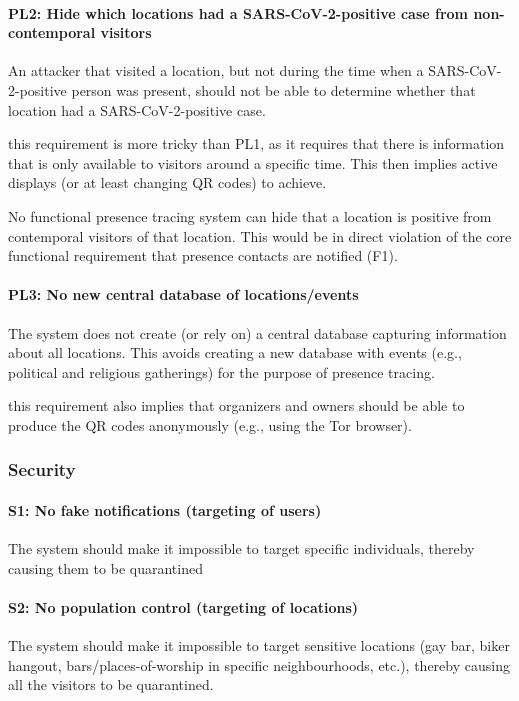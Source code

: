\paragraph{PL2: Hide which locations had a SARS-CoV-2-positive case from non-contemporal visitors} An attacker that visited a location, but not during the time when a SARS-CoV-2-positive person was present, should not be able to determine whether that location had a SARS-CoV-2-positive case.

 this requirement is more tricky than PL1, as it requires that there is information that is only available to visitors around a specific time. This then implies active displays (or at least changing QR codes) to achieve.

 No functional presence tracing system can hide that a location is positive from contemporal visitors of that location. This would be in direct violation of the core functional requirement that presence contacts are notified (F1).

\paragraph{PL3: No new central database of locations/events} The system does not create (or rely on) a central database capturing information about all locations. This avoids creating a new database with events (e.g., political and religious gatherings) for the purpose of presence tracing.

 this requirement also implies that organizers and owners should be able to produce the QR codes anonymously (e.g., using the Tor browser). 

\subsubsection{Security}

\paragraph{S1: No fake notifications (targeting of users)} The system should make it impossible to target specific individuals, thereby causing them to be quarantined

\paragraph{S2: No population control (targeting of locations)} The system should make it impossible to target sensitive locations (gay bar, biker hangout, bars/places-of-worship in specific neighbourhoods, etc.), thereby causing all the visitors to be quarantined.

